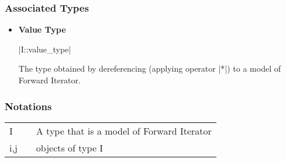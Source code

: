 \documentclass[12pt,twoside]{report}
\begin{document}
\subsubsection*{Associated Types}


\begin{itemize}
\item {\bf Value Type}

  |I::value_type|

  The type obtained by dereferencing (applying operator |*|) to a model of Forward Iterator.

\end{itemize}


\htmlrule[CLEAR=all]
 

\subsubsection*{Notations}

\begin{tabular}[!h]{l l l}
I & & A type that is a model of Forward Iterator\\
i,j & & objects of type I\\
\end{tabular}


\htmlrule[CLEAR=all]
 
\end{document}
